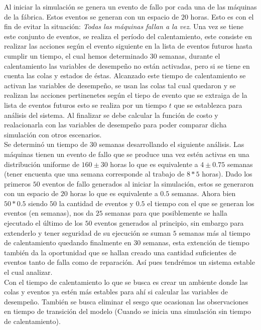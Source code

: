 \documentclass[10pt]{article}
\begin{document}
Al iniciar la simulación se genera un evento de fallo por cada una de las máquinas de la fábrica. Estos eventos se generan con un  espacio de $20$ horas. Esto es con el fin de evitar la situación: \emph{Todas las máquinas fallan a la vez}. Una vez se tiene este conjunto de eventos, se realiza el período del calentamiento, este consiste en realizar las acciones seg\'un el evento siguiente en la lista de eventos futuros hasta cumplir un tiempo, el cual hemos determinado 30 semanas, durante el calentamiento las variables de desempeño no están activadas, pero si se tiene en cuenta las colas y estados de éstas. Alcanzado este tiempo de calentamiento se activan las variables de desempeño, se usan las colas tal cual quedaron y se realizan las acciones pertinenetes seg\'un el tiepo de evento que se extraiga de la lista de eventos futuros esto se realiza por un tiempo $t$ que se establezca para análisis del sistema. Al finalizar se debe calcular la función de costo y realacionarla con las variables de desempeño para poder comparar dicha simulación con otros escenarios.\\

Se determinó un tiempo de 30 semanas desarrollando el siguiente análisis. Las máquinas tienen un evento de fallo que se produce una vez estén activas en una distribución uniforme de $160\pm30$ horas lo que es equivalente a $4\pm0.75$ semanas (tener encuenta que una semana corresponde al trabajo de $8*5$  horas). Dado los primeros $50$ eventos de fallo generados al iniciar la simulación, estos se generaron con un espacio de $20$ horas lo que es equivalente a $0.5$ semanas. Ahora bien $50*0.5$ siendo $50$ la cantidad de eventos y $0.5$ el tiempo con el que se generan los eventos (en semanas), nos da $25$ semanas para que posiblemente se halla ejecutado el último de los $50$ eventos generados al principio, sin embargo para extenderlo y tener seguridad de su ejecución se suman $5$ semanas más al tiempo de calentamiento quedando finalmente en $30$ semanas, esta extención de tiempo también da la oportunidad que se hallan creado una cantidad suficientes de eventos tanto de falla como de reparación. Así pues tendrémos un sistema estable el cual analizar.\\



Con el tiempo de calentamiento lo que se busca es crear un ambiente donde las colas y eventos ya estén más estables para ahí si calcular las variables de desempeño. También se busca eliminar el sesgo que ocasionan las observaciones en tiempo de transición del modelo (Cuando se inicia una simulación sin tiempo de calentamiento). \\
\end{document}
